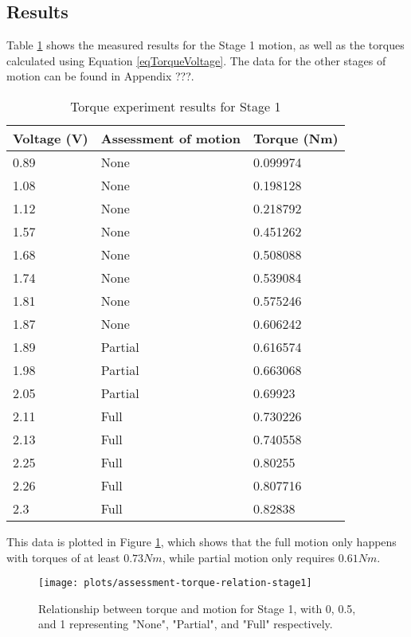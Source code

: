 \subsection{Results}

Table \ref{tableStage1Torque} shows the measured results for the Stage 1 motion, as well as the torques calculated using Equation \ref{eqTorqueVoltage}. The data for the other stages of motion can be found in Appendix ???.

\begin{table}[!h]
	\caption{Torque experiment results for Stage 1}
	\label{tableStage1Torque}
	\centering
	\begin{tabular}{|l|l|l|}
		\hline
		Voltage (V) & Assessment of motion & Torque (Nm) \\ \hline
		0.89 & None & 0.099974 \\ \hline
		1.08 & None & 0.198128 \\ \hline
		1.12 & None & 0.218792 \\ \hline
		1.57 & None & 0.451262 \\ \hline
		1.68 & None & 0.508088 \\ \hline
		1.74 & None & 0.539084 \\ \hline
		1.81 & None & 0.575246 \\ \hline
		1.87 & None & 0.606242 \\ \hline
		1.89 & Partial & 0.616574 \\ \hline
		1.98 & Partial & 0.663068 \\ \hline
		2.05 & Partial & 0.69923 \\ \hline
		2.11 & Full & 0.730226 \\ \hline
		2.13 & Full & 0.740558 \\ \hline
		2.25 & Full & 0.80255 \\ \hline
		2.26 & Full & 0.807716 \\ \hline
		2.3 & Full & 0.82838 \\ \hline
	\end{tabular}
\end{table}

This data is plotted in Figure \ref{plotassessment-torque-relation-stage1}, which shows that the full motion only happens with torques of at least $0.73 Nm$, while partial motion only requires $0.61 Nm$.

\begin{figure}[h]
	\centering
	\texttt{[image: plots/assessment-torque-relation-stage1]}
	\caption{Relationship between torque and motion for Stage 1, with 0, 0.5, and 1 representing "None", "Partial", and "Full" respectively.}
	\label{plotassessment-torque-relation-stage1}
\end{figure}


